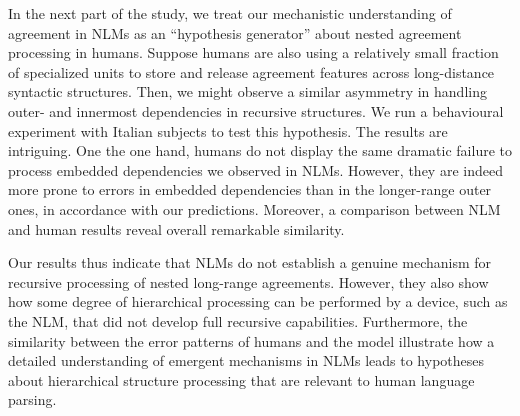 In the next part of the study, we treat our mechanistic understanding of
agreement in NLMs as an ``hypothesis generator''
\citep{Cichy:Kaiser:2019} about nested agreement processing in
humans. Suppose humans are also using a relatively small fraction of specialized units
to store and release agreement features across long-distance syntactic
structures. Then, we might observe a similar asymmetry in handling
outer- and innermost dependencies in recursive structures. We run a
behavioural experiment with Italian subjects to test this
hypothesis. The results are intriguing. One the one hand, humans do
not display the same dramatic failure to process embedded dependencies we observed in NLMs. However, they are indeed more prone to errors in embedded dependencies than in the longer-range outer ones, in accordance with our predictions. Moreover, a comparison between NLM and human results reveal overall remarkable similarity. 

Our results thus indicate that NLMs do not establish a genuine mechanism for recursive processing of nested long-range agreements. However, they also show how some degree of hierarchical processing can be performed by a device, such as the NLM, that did not develop full recursive capabilities. Furthermore, the similarity between the error patterns of humans and the model illustrate how a detailed understanding of emergent mechanisms in NLMs leads to hypotheses about hierarchical structure processing that are relevant to human language parsing.